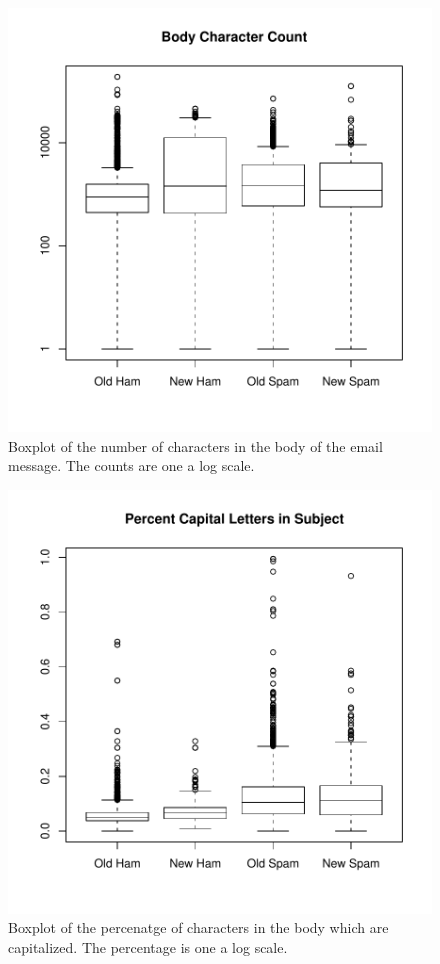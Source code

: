 \begin{figure}
\includegraphics{Spam/knnBoxPlotBCC.pdf}
\caption{Boxplot of the number of characters in the body of the
email message. The counts are one a log scale.}
\label{fig:knnBoxPlotBCC}
\end{figure}

\begin{figure}
\includegraphics{Spam/knnBoxPlotPC.pdf}
\caption{Boxplot of the percenatge of characters in the body which
are capitalized. The percentage is one a log scale.}
\label{fig:knnBoxPlotPC}
\end{figure}


